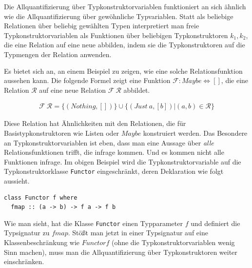 Die Allquantifizierung über Typkonstruktorvariablen funktioniert an sich ähnlich wie die Allquantifizierung über gewöhnliche
Typvariablen. Statt als beliebige Relationen über beliebig gewählten Typen interpretiert man freie Typkonstruktorvariablen als
Funktionen über beliebigen Typkonstruktoren $k_1, k_2$, die eine Relation auf eine neue abbilden, indem sie die Typkonstruktoren
auf die Typmengen der Relation anwenden.

Es bietet sich an, an einem Beispiel zu zeigen, wie eine solche Relationsfunktion aussehen kann. Die folgende Formel zeigt eine
Funktion $\mathcal{F} : Maybe \Leftrightarrow []$, die eine Relation $\mathcal{R}$ auf eine neue Relation
$\mathcal{F}~\mathcal{R}$ abbildet.

\begin{align*}
\mathcal{F}~\mathcal{R} = \{ (Nothing, []) \} \cup \{(Just\ a, [b]) | (a, b) \in \mathcal{R}\}
\end{align*}

Diese Relation hat Ähnlichkeiten mit den Relationen, die für Basistypkonstruktoren wie Listen oder $Maybe$ konstruiert
werden.
Das Besondere an Typkonstruktorvariablen ist eben, dass man eine Aussage über \textit{alle} Relationsfunktionen trifft,
die infrage kommen.
Und es kommen nicht alle Funktionen infrage. Im obigen Beispiel wird die Typkonstruktorvariable auf die Typkonstruktorklasse
\texttt{Functor} eingeschränkt, deren Deklaration wie folgt aussieht.

\begin{verbatim}
class Functor f where
  fmap :: (a -> b) -> f a -> f b
\end{verbatim}

Wie man sieht, hat die Klasse \texttt{Functor} einen Typparameter $f$ und definiert die Typsignatur zu $fmap$. Stößt man jetzt in
einer Typsignatur auf eine Klassenbeschränkung wie $Functor f$ (ohne die Typkonstruktorvariablen wenig Sinn machen),
muss man die Allquantifizierung über Typkonstruktoren weiter einschränken.


